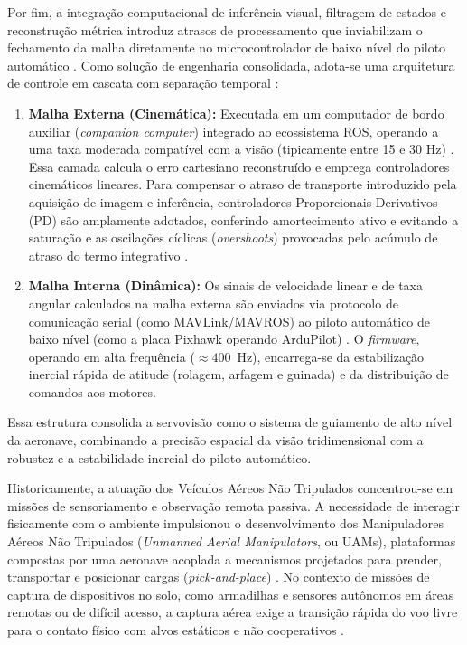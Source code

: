 Por fim, a integração computacional de inferência visual, filtragem de estados e reconstrução métrica introduz atrasos de processamento que inviabilizam o fechamento da malha diretamente no microcontrolador de baixo nível do piloto automático \cite{lopezfranco2017}. Como solução de engenharia consolidada, adota-se uma arquitetura de controle em cascata com separação temporal \cite{shang2016, sciortino2018}:
\begin{enumerate}
    \item \textbf{Malha Externa (Cinemática):} Executada em um computador de bordo auxiliar (\textit{companion computer}) integrado ao ecossistema ROS, operando a uma taxa moderada compatível com a visão (tipicamente entre 15 e 30 Hz) \cite{sciortino2018}. Essa camada calcula o erro cartesiano reconstruído e emprega controladores cinemáticos lineares. Para compensar o atraso de transporte introduzido pela aquisição de imagem e inferência, controladores Proporcionais-Derivativos (PD) são amplamente adotados, conferindo amortecimento ativo e evitando a saturação e as oscilações cíclicas (\textit{overshoots}) provocadas pelo acúmulo de atraso do termo integrativo \cite{shang2016, carvajal2024}.
    \item \textbf{Malha Interna (Dinâmica):} Os sinais de velocidade linear e de taxa angular calculados na malha externa são enviados via protocolo de comunicação serial (como MAVLink/MAVROS) ao piloto automático de baixo nível (como a placa Pixhawk operando ArduPilot) \cite{shang2016, sciortino2018}. O \textit{firmware}, operando em alta frequência ($\approx 400$~Hz), encarrega-se da estabilização inercial rápida de atitude (rolagem, arfagem e guinada) e da distribuição de comandos aos motores.
\end{enumerate}
Essa estrutura consolida a servovisão como o sistema de guiamento de alto nível da aeronave, combinando a precisão espacial da visão tridimensional com a robustez e a estabilidade inercial do piloto automático.


Historicamente, a atuação dos Veículos Aéreos Não Tripulados concentrou-se em missões de sensoriamento e observação remota passiva. A necessidade de interagir fisicamente com o ambiente impulsionou o desenvolvimento dos Manipuladores Aéreos Não Tripulados (\textit{Unmanned Aerial Manipulators}, ou UAMs), plataformas compostas por uma aeronave acoplada a mecanismos projetados para prender, transportar e posicionar cargas (\textit{pick-and-place}) \cite{bonyan2018, meng2020, abuzayed2020}. No contexto de missões de captura de dispositivos no solo, como armadilhas e sensores autônomos em áreas remotas ou de difícil acesso, a captura aérea exige a transição rápida do voo livre para o contato físico com alvos estáticos e não cooperativos \cite{bonyan2018, cocuzza2021}.

